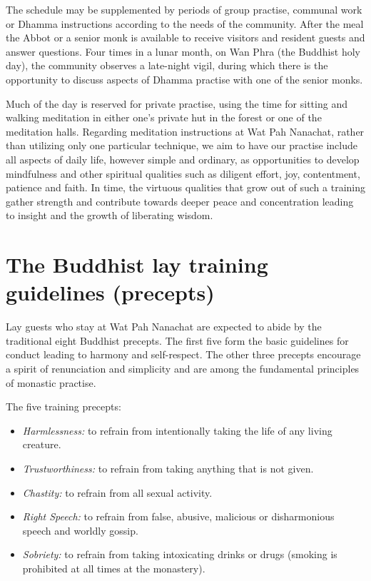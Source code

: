 The schedule may be supplemented by periods of group practise, communal
work or Dhamma instructions according to the needs of the community.
After the meal the Abbot or a senior monk is available to receive
visitors and resident guests and answer questions. Four times in a lunar
month, on Wan Phra (the Buddhist holy day), the community observes a
late-night vigil, during which there is the opportunity to discuss
aspects of Dhamma practise with one of the senior monks.

Much of the day is reserved for private practise, using the time for
sitting and walking meditation in either one's private hut in the forest
or one of the meditation halls. Regarding meditation instructions at Wat
Pah Nanachat, rather than utilizing only one particular technique, we
aim to have our practise include all aspects of daily life, however
simple and ordinary, as opportunities to develop mindfulness and other
spiritual qualities such as diligent effort, joy, contentment, patience
and faith. In time, the virtuous qualities that grow out of such a
training gather strength and contribute towards deeper peace and
concentration leading to insight and the growth of liberating
wisdom.

\section{The Buddhist lay training guidelines (precepts)}

Lay guests who stay at Wat Pah Nanachat are expected to abide by the
traditional eight Buddhist precepts. The first five form the basic
guidelines for conduct leading to harmony and self-respect. The other
three precepts encourage a spirit of renunciation and simplicity and are
among the fundamental principles of monastic practise.

The five training precepts:

\begin{itemize}

  \item \emph{Harmlessness:} to refrain from intentionally taking the life of
    any living creature.

  \item \emph{Trustworthiness:} to refrain from taking anything that is not
    given.

  \item \emph{Chastity:} to refrain from all sexual activity.

  \item \emph{Right Speech:} to refrain from false, abusive, malicious or
    disharmonious speech and worldly gossip.

  \item \emph{Sobriety:} to refrain from taking intoxicating drinks or drugs
    (smoking is prohibited at all times at the monastery).
\end{itemize}

